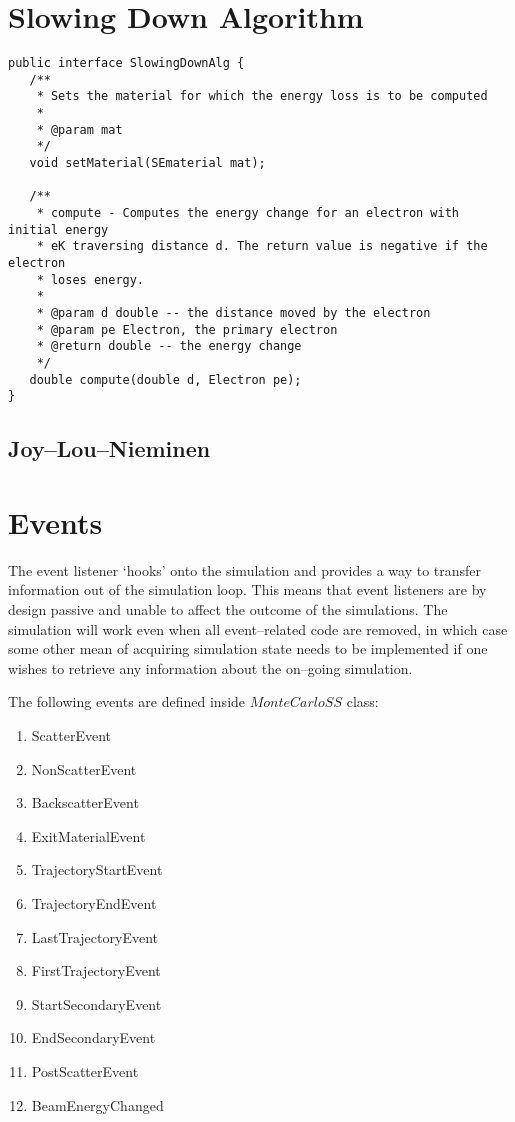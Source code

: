 \section{Slowing Down Algorithm}\label{impl:sda}
\begin{lstlisting}
public interface SlowingDownAlg {
   /**
    * Sets the material for which the energy loss is to be computed
    *
    * @param mat
    */
   void setMaterial(SEmaterial mat);

   /**
    * compute - Computes the energy change for an electron with initial energy
    * eK traversing distance d. The return value is negative if the electron
    * loses energy.
    *
    * @param d double -- the distance moved by the electron
    * @param pe Electron, the primary electron
    * @return double -- the energy change
    */
   double compute(double d, Electron pe);
}
\end{lstlisting}
\subsection{Joy--Lou--Nieminen}

\section{Events}\label{impl:events}
The event listener `hooks' onto the simulation and provides a way to transfer information out of the simulation loop. This means that event listeners are by design passive and unable to affect the outcome of the simulations. The simulation will work even when all event--related code are removed, in which case some other mean of acquiring simulation state needs to be implemented if one wishes to retrieve any information about the on--going simulation.

The following events are defined inside $MonteCarloSS$ class:
\begin{enumerate}
\item ScatterEvent
\item NonScatterEvent
\item BackscatterEvent
\item ExitMaterialEvent
\item TrajectoryStartEvent
\item TrajectoryEndEvent
\item LastTrajectoryEvent
\item FirstTrajectoryEvent
\item StartSecondaryEvent
\item EndSecondaryEvent
\item PostScatterEvent
\item BeamEnergyChanged
\end{enumerate}

